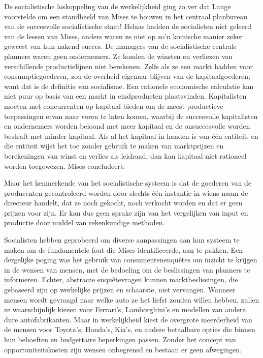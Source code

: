 De socialistische loskoppeling van de werkelijkheid ging zo ver dat Lange voorstelde om een standbeeld van Mises te bouwen in het centraal planbureau van de succesvolle socialistische staat! Helaas hadden de socialisten niet geleerd van de lessen van Mises, anders waren ze niet op zo'n komische manier zeker geweest van hun nakend succes. De managers van de socialistische centrale planners waren geen ondernemers. Ze konden de winsten en verliezen van verschillende productielijnen niet berekenen. Zelfs als ze een markt hadden voor consumptiegoederen, zou de overheid eigenaar blijven van de kapitaalgoederen, want dat is de definitie van socialisme. Een rationele economische calculatie kan niet puur op basis van een markt in eindproducten plaatsvinden. Kapitalisten moeten met concurrenten op kapitaal bieden om de meest productieve toepassingen ervan naar voren te laten komen, waarbij de succesvolle kapitalisten en ondernemers worden beloond met meer kapitaal en de onsuccesvolle worden bestraft met minder kapitaal. Als al het kapitaal in handen is van één entiteit, en die entiteit wijst het toe zonder gebruik te maken van marktprijzen en berekeningen van winst en verlies als leidraad, dan kan kapitaal niet rationeel worden toegewezen. Mises concludeert:

\begin{blockquotebox}
    Maar het kenmerkende van het socialistische systeem is dat de goederen van de producenten gecontroleerd worden door slechts één instantie in wiens naam de directeur handelt, dat ze noch gekocht, noch verkocht worden en dat er geen prijzen voor zijn. Er kan dus geen sprake zijn van het vergelijken van input en productie door middel van rekenkundige methoden.\footnotemark
\end{blockquotebox}

Socialisten hebben geprobeerd om diverse aanpassingen aan hun systeem te maken om de fundamentele fout die Mises identificeerde, aan te pakken. Een dergelijke poging was het gebruik van consumentenenquêtes om inzicht te krijgen in de wensen van mensen, met de bedoeling om de beslissingen van planners te informeren. Echter, abstracte enquêtevragen kunnen marktbeslissingen, die gebaseerd zijn op werkelijke prijzen en schaarste, niet vervangen. Wanneer mensen wordt gevraagd naar welke auto ze het liefst zouden willen hebben, zullen ze waarschijnlijk kiezen voor Ferrari's, Lamborghini's en modellen van andere dure autofabrikanten. Maar in werkelijkheid kiest de overgrote meerderheid van de mensen voor Toyota's, Honda's, Kia's, en andere betaalbare opties die binnen hun behoeften en budgettaire beperkingen passen. Zonder het concept van opportuniteitskosten zijn wensen onbegrensd en bestaan er geen afwegingen.

